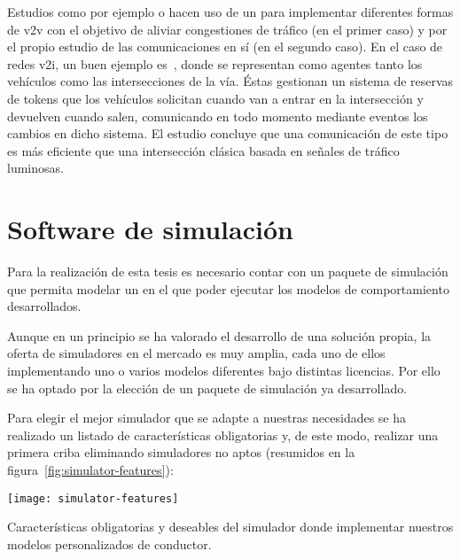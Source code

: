 Estudios como por ejemplo \cite{Shiose2001} o \cite{Galis2000} hacen uso de un  para implementar diferentes formas de \gls{v2v} con el objetivo de aliviar congestiones de tráfico (en el primer caso) y por el propio estudio de las comunicaciones en sí (en el segundo caso). En el caso de redes \gls{v2i}, un buen ejemplo es~\cite{Dresner2004}, donde se representan como agentes tanto los vehículos como las intersecciones de la vía. Éstas gestionan un sistema de reservas de tokens que los vehículos solicitan cuando van a entrar en la intersección y devuelven cuando salen, comunicando en todo momento mediante eventos los cambios en dicho sistema. El estudio concluye que una comunicación de este tipo es más eficiente que una intersección clásica basada en señales de tráfico luminosas.

\section{Software de simulación}

Para la realización de esta tesis es necesario contar con un paquete de simulación que permita modelar un  en el que poder ejecutar los modelos de comportamiento desarrollados.

Aunque en un principio se ha valorado el desarrollo de una solución propia, la oferta de simuladores en el mercado es muy amplia, cada uno de ellos implementando uno o varios modelos diferentes bajo distintas licencias. Por ello se ha optado por la elección de un paquete de simulación ya desarrollado.


Para elegir el mejor simulador que se adapte a nuestras necesidades se ha realizado un listado de características obligatorias y, de este modo, realizar una primera criba eliminando simuladores no aptos (resumidos en la figura~\ref{fig:simulator-features}):

\begin{marginfigure}
	\centering
	\texttt{[image: simulator-features]}
	\caption[Características obligatorias y deseables del simulador a elegir]{Características obligatorias y deseables del simulador donde implementar nuestros modelos personalizados de conductor.}
	\label{fig:simulator-features}
\end{marginfigure}

